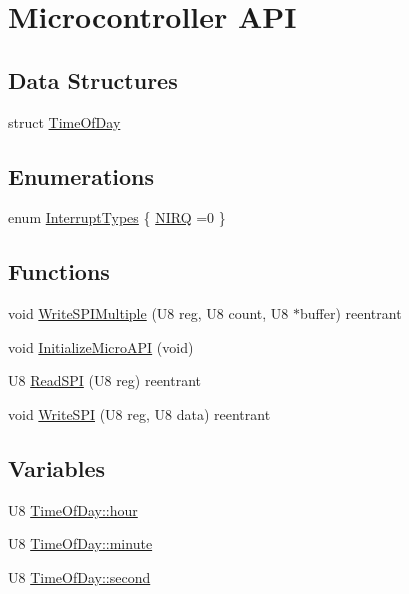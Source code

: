 \hypertarget{group___microcontroller}{\section{Microcontroller A\-P\-I}
\label{group___microcontroller}
}
\subsection*{Data Structures}
\begin{DoxyCompactItemize}
\item 
struct \hyperlink{struct_time_of_day}{Time\-Of\-Day}
\end{DoxyCompactItemize}
\subsection*{Enumerations}
\begin{DoxyCompactItemize}
\item 
enum \hyperlink{group___microcontroller_gacdad6d81b9a94402ce3979d531ae4f40}{Interrupt\-Types} \{ \hyperlink{group___microcontroller_ggacdad6d81b9a94402ce3979d531ae4f40ab6c06d9faecfce59a7da45b7944780bd}{N\-I\-R\-Q} =0
 \}
\end{DoxyCompactItemize}
\subsection*{Functions}
\begin{DoxyCompactItemize}
\item 
void \hyperlink{group___microcontroller_ga5f2da15600290897285c56ec4c61c845}{Write\-S\-P\-I\-Multiple} (U8 reg, U8 count, U8 $\ast$buffer) reentrant
\item 
void \hyperlink{group___microcontroller_gabdc71036637d954e4696a6800f3e64be}{Initialize\-Micro\-A\-P\-I} (void)
\item 
U8 \hyperlink{group___microcontroller_gad7f37d8605b8b3ce2e6915c969f17247}{Read\-S\-P\-I} (U8 reg) reentrant
\item 
void \hyperlink{group___microcontroller_gab87fac7c7e38cca5b160e0e975ed7664}{Write\-S\-P\-I} (U8 reg, U8 data) reentrant
\end{DoxyCompactItemize}
\subsection*{Variables}
\begin{DoxyCompactItemize}
\item 
U8 \hyperlink{group___microcontroller_gaa4f95286ba64d87b1d69c7bf2ce4db6d}{Time\-Of\-Day\-::hour}
\item 
U8 \hyperlink{group___microcontroller_ga21ec20909874235c6b6962ce326411d9}{Time\-Of\-Day\-::minute}
\item 
U8 \hyperlink{group___microcontroller_ga98c2745c67f408461639d09e76db81b5}{Time\-Of\-Day\-::second}
\end{DoxyCompactItemize}


